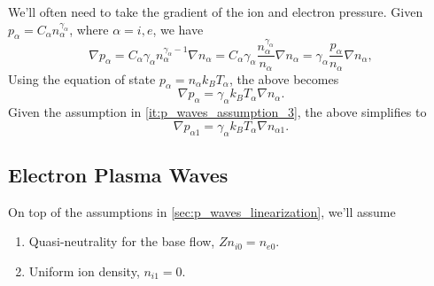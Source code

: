 \documentclass[a4paper,11pt]{report}
\begin{document}
We'll often need to take the gradient of the ion and electron pressure. Given $p_\alpha = C_\alpha n_\alpha^{\gamma_\alpha}$, where $\alpha = i,e$, we have 
\begin{equation*}
    \nabla p_\alpha = C_\alpha \gamma_\alpha n_\alpha^{\gamma_\alpha-1} \nabla n_\alpha = C_\alpha \gamma_\alpha \frac{n_\alpha^{\gamma_\alpha}}{n_\alpha} \nabla n_\alpha = \gamma_\alpha \frac{p_\alpha}{n_\alpha} \nabla n_\alpha,
\end{equation*}
Using the equation of state $p_\alpha = n_\alpha k_B T_\alpha$, the above becomes
\begin{equation}
    \nabla p_\alpha = \gamma_\alpha k_B T_\alpha \nabla n_\alpha.
\end{equation}
Given the assumption in \cref{it:p_waves_assumption_3}, the above simplifies to
\begin{equation}
    \label{eq:p_waves_pressure_gradient}
    \nabla p_{\alpha 1} = \gamma_\alpha k_B T_\alpha \nabla n_{\alpha 1}.
\end{equation}

\subsection{Electron Plasma Waves}
\label{sec:ep_waves}
On top of the assumptions in \cref{sec:p_waves_linearization}, we'll assume 
\begin{enumerate}
    \item Quasi-neutrality for the base flow, $Zn_{i0} = n_{e0}$.
    \item Uniform ion density, $n_{i1} = 0$.
\end{enumerate}
\end{document}
